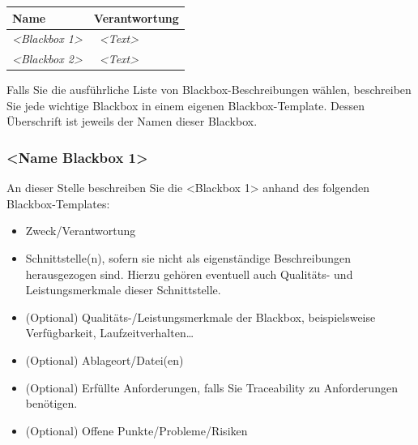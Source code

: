 \documentclass[]{article}
\begin{document}
\begin{longtable}[]{@{}ll@{}}
\toprule
\begin{minipage}[b]{0.31\columnwidth}\raggedright\strut
\textbf{Name}\strut
\end{minipage} & \begin{minipage}[b]{0.63\columnwidth}\raggedright\strut
\textbf{Verantwortung}\strut
\end{minipage}\tabularnewline
\midrule
\endhead
\begin{minipage}[t]{0.31\columnwidth}\raggedright\strut
\emph{\textless{}Blackbox 1\textgreater{}}\strut
\end{minipage} & \begin{minipage}[t]{0.63\columnwidth}\raggedright\strut
~\emph{\textless{}Text\textgreater{}}\strut
\end{minipage}\tabularnewline
\begin{minipage}[t]{0.31\columnwidth}\raggedright\strut
\emph{\textless{}Blackbox 2\textgreater{}}\strut
\end{minipage} & \begin{minipage}[t]{0.63\columnwidth}\raggedright\strut
~\emph{\textless{}Text\textgreater{}}\strut
\end{minipage}\tabularnewline
\bottomrule
\end{longtable}

Falls Sie die ausführliche Liste von Blackbox-Beschreibungen wählen,
beschreiben Sie jede wichtige Blackbox in einem eigenen
Blackbox-Template. Dessen Überschrift ist jeweils der Namen dieser
Blackbox.

\subsubsection{\textless{}Name Blackbox
1\textgreater{}}\label{__name_blackbox_1}

An dieser Stelle beschreiben Sie die \textless{}Blackbox 1\textgreater{}
anhand des folgenden Blackbox-Templates:

\begin{itemize}
\item
  Zweck/Verantwortung
\item
  Schnittstelle(n), sofern sie nicht als eigenständige Beschreibungen
  herausgezogen sind. Hierzu gehören eventuell auch Qualitäts- und
  Leistungsmerkmale dieser Schnittstelle.
\item
  (Optional) Qualitäts-/Leistungsmerkmale der Blackbox, beispielsweise
  Verfügbarkeit, Laufzeitverhalten\ldots{}
\item
  (Optional) Ablageort/Datei(en)
\item
  (Optional) Erfüllte Anforderungen, falls Sie Traceability zu
  Anforderungen benötigen.
\item
  (Optional) Offene Punkte/Probleme/Risiken
\end{itemize}
\end{document}

